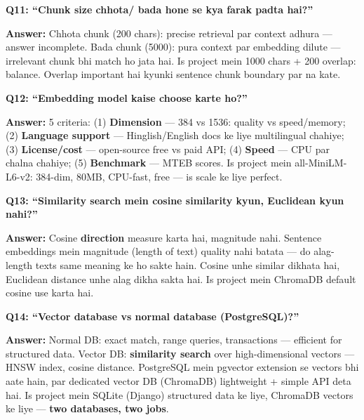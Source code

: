 \begin{interviewbox}
\textbf{Q11: ``Chunk size chhota/ bada hone se kya farak padta hai?''}

\textbf{Answer:} Chhota chunk (200 chars): precise retrieval par context adhura --- answer incomplete. Bada chunk (5000): pura context par embedding dilute --- irrelevant chunk bhi match ho jata hai. Is project mein 1000 chars + 200 overlap: balance. Overlap important hai kyunki sentence chunk boundary par na kate.
\end{interviewbox}

\begin{interviewbox}
\textbf{Q12: ``Embedding model kaise choose karte ho?''}

\textbf{Answer:} 5 criteria: (1) \textbf{Dimension} --- 384 vs 1536: quality vs speed/memory; (2) \textbf{Language support} --- Hinglish/English docs ke liye multilingual chahiye; (3) \textbf{License/cost} --- open-source free vs paid API; (4) \textbf{Speed} --- CPU par chalna chahiye; (5) \textbf{Benchmark} --- MTEB scores. Is project mein all-MiniLM-L6-v2: 384-dim, 80MB, CPU-fast, free --- is scale ke liye perfect.
\end{interviewbox}

\begin{interviewbox}
\textbf{Q13: ``Similarity search mein cosine similarity kyun, Euclidean kyun nahi?''}

\textbf{Answer:} Cosine \textbf{direction} measure karta hai, magnitude nahi. Sentence embeddings mein magnitude (length of text) quality nahi batata --- do alag-length texts same meaning ke ho sakte hain. Cosine unhe similar dikhata hai, Euclidean distance unhe alag dikha sakta hai. Is project mein ChromaDB default cosine use karta hai.
\end{interviewbox}

\begin{interviewbox}
\textbf{Q14: ``Vector database vs normal database (PostgreSQL)?''}

\textbf{Answer:} Normal DB: exact match, range queries, transactions --- efficient for structured data. Vector DB: \textbf{similarity search} over high-dimensional vectors --- HNSW index, cosine distance. PostgreSQL mein pgvector extension se vectors bhi aate hain, par dedicated vector DB (ChromaDB) lightweight + simple API deta hai. Is project mein SQLite (Django) structured data ke liye, ChromaDB vectors ke liye --- \textbf{two databases, two jobs}.
\end{interviewbox}

